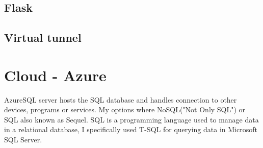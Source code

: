 
\subsection{Flask}


\subsection{Virtual tunnel}



\section{Cloud - Azure}
AzureSQL server hosts the SQL database and handles connection to other devices, programs or services. 
My options where NoSQL("Not Only SQL") or SQL also known as Sequel.
SQL is a programming language used to manage data in a relational database, I specifically used T-SQL for querying data in Microsoft SQL Server. 




